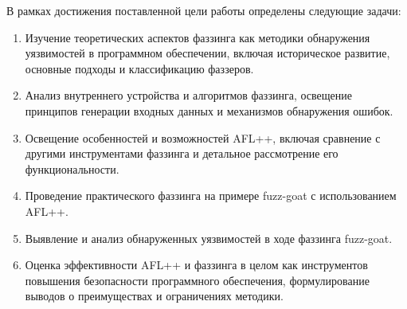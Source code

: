 В рамках достижения поставленной цели работы определены следующие задачи:
\begin{enumerate}
	\item Изучение теоретических аспектов фаззинга как методики обнаружения уязвимостей в программном обеспечении, включая историческое развитие, основные подходы и классификацию фаззеров.
	\item Анализ внутреннего устройства и алгоритмов фаззинга, освещение принципов генерации входных данных и механизмов обнаружения ошибок.
	\item Освещение особенностей и возможностей AFL++, включая сравнение с другими инструментами фаззинга и детальное рассмотрение его функциональности.
	\item Проведение практического фаззинга на примере fuzz-goat с использованием AFL++.
	\item Выявление и анализ обнаруженных уязвимостей в ходе фаззинга fuzz-goat.
	\item Оценка эффективности AFL++ и фаззинга в целом как инструментов повышения безопасности программного обеспечения, формулирование выводов о преимуществах и ограничениях методики.
\end{enumerate}

